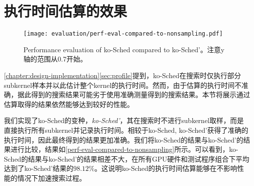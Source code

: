 \section{执行时间估算的效果}\label{exp-est}

\begin{figure}[htbp]
    \centering
    \texttt{[image: evaluation/perf-eval-compared-to-nonsampling.pdf]}
    \caption{Performance evaluation of ko-Sched compared to ko-Sched'。注意y轴的范围从0.7开始。}
    \label{perf-eval-compared-to-nonsampling}
\end{figure}

\autoref{chapter:design-implementation}\autoref{sec:profile}提到，ko-Sched在搜索时仅执行部分subkernel样本并以此估计整个kernel的执行时间。然而，由于估算的执行时间不准确，据此得到的搜索结果可能劣于使用准确测量得到的搜索结果。本节将展示通过估算取得的结果依然能够达到较好的性能。

我们实现了ko-Sched的变种，\emph{ko-Sched'}，其在搜索时不进行subkernel取样，而是直接执行所有subkernel并记录执行时间。相较于ko-Sched, ko-Sched'获得了准确的执行时间，因此最终得到的结果更加准确。我们将ko-Sched的结果与ko-Sched'的结果进行比较，结果如\autoref{perf-eval-compared-to-nonsampling}所示。可以看到，ko-Sched的结果与ko-Sched'的结果相差不大，在所有GPU硬件和测试程序组合下平均达到了ko-Sched'结果的$98.12\%$。这说明ko-Sched的执行时间估算能够在不影响性能的情况下加速搜索过程。
